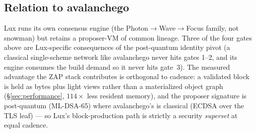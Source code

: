 \subsection{Relation to avalanchego}

Lux runs its own consensus engine (the Photon$\to$Wave$\to$Focus family,
not snowman) but retains a proposer-VM of common lineage. Three of the
four gates above are Lux-specific consequences of the post-quantum
identity pivot (a classical single-scheme network like avalanchego never
hits gates 1--2, and its engine consumes the build demand so it never
hits gate~3). The measured advantage the ZAP stack contributes is
orthogonal to cadence: a validated block is held as bytes plus light
views rather than a materialized object graph
(\S\ref{sec:performance}, $114\times$ less resident memory), and the
proposer signature is post-quantum (ML-DSA-65) where avalanchego's is
classical (ECDSA over the TLS leaf) --- so Lux's block-production path is
strictly a security \emph{superset} at equal cadence.
